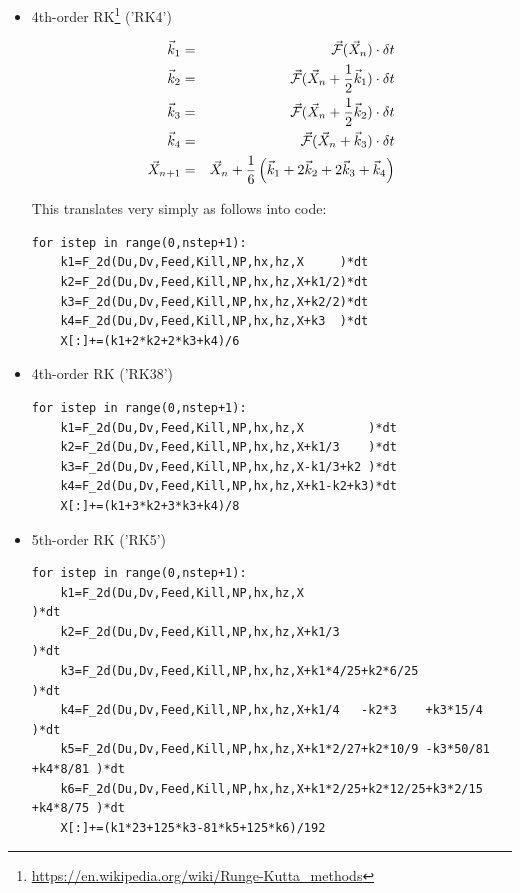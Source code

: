 \begin{itemize}
\item 4th-order RK\footnote{\url{https://en.wikipedia.org/wiki/Runge-Kutta_methods}} ('RK4')

\begin{eqnarray}
\vec{k}_1 &=& \vec{\cal F}(\vec{X}_n) \cdot \delta t\nonumber\\
\vec{k}_2 &=& \vec{\cal F}(\vec{X}_n+ \frac12\vec{k}_1) \cdot \delta t \nonumber\\
\vec{k}_3 &=& \vec{\cal F}(\vec{X}_n+ \frac12\vec{k}_2) \cdot \delta t \nonumber\\
\vec{k}_4 &=& \vec{\cal F}(\vec{X}_n+ \vec{k}_3)    \cdot \delta t \nonumber \\
\vec{X}_{n+1} &=& \vec{X}_n + \frac{1}{6}\left(\vec{k}_1 + 2\vec{k}_2 + 2\vec{k}_3 + \vec{k}_4\right)
\end{eqnarray}

This translates very simply as follows into code:
\begin{lstlisting}
for istep in range(0,nstep+1):
    k1=F_2d(Du,Dv,Feed,Kill,NP,hx,hz,X     )*dt
    k2=F_2d(Du,Dv,Feed,Kill,NP,hx,hz,X+k1/2)*dt
    k3=F_2d(Du,Dv,Feed,Kill,NP,hx,hz,X+k2/2)*dt
    k4=F_2d(Du,Dv,Feed,Kill,NP,hx,hz,X+k3  )*dt
    X[:]+=(k1+2*k2+2*k3+k4)/6
\end{lstlisting}


\item 4th-order RK ('RK38')

\begin{lstlisting}
for istep in range(0,nstep+1):
    k1=F_2d(Du,Dv,Feed,Kill,NP,hx,hz,X         )*dt
    k2=F_2d(Du,Dv,Feed,Kill,NP,hx,hz,X+k1/3    )*dt
    k3=F_2d(Du,Dv,Feed,Kill,NP,hx,hz,X-k1/3+k2 )*dt
    k4=F_2d(Du,Dv,Feed,Kill,NP,hx,hz,X+k1-k2+k3)*dt
    X[:]+=(k1+3*k2+3*k3+k4)/8
\end{lstlisting}

\item 5th-order RK ('RK5')

\begin{lstlisting}
for istep in range(0,nstep+1):
    k1=F_2d(Du,Dv,Feed,Kill,NP,hx,hz,X                                    )*dt
    k2=F_2d(Du,Dv,Feed,Kill,NP,hx,hz,X+k1/3                               )*dt
    k3=F_2d(Du,Dv,Feed,Kill,NP,hx,hz,X+k1*4/25+k2*6/25                    )*dt
    k4=F_2d(Du,Dv,Feed,Kill,NP,hx,hz,X+k1/4   -k2*3    +k3*15/4           )*dt
    k5=F_2d(Du,Dv,Feed,Kill,NP,hx,hz,X+k1*2/27+k2*10/9 -k3*50/81 +k4*8/81 )*dt
    k6=F_2d(Du,Dv,Feed,Kill,NP,hx,hz,X+k1*2/25+k2*12/25+k3*2/15  +k4*8/75 )*dt
    X[:]+=(k1*23+125*k3-81*k5+125*k6)/192
\end{lstlisting}


\end{itemize}
